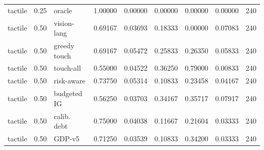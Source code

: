 \documentclass{article}
\begin{document}
\begin{center}
\begin{longtable}{lllllllll}
tactile & 0.25 & oracle & 1.00000 & 0.00000 & 0.00000 & 0.00000 & 0.00000 & 240 \\
tactile & 0.50 & vision-lang & 0.69167 & 0.03693 & 0.18333 & 0.00000 & 0.07083 & 240 \\
tactile & 0.50 & greedy touch & 0.69167 & 0.05472 & 0.25833 & 0.26350 & 0.05833 & 240 \\
tactile & 0.50 & touch-all & 0.55000 & 0.04522 & 0.36250 & 0.79000 & 0.00833 & 240 \\
tactile & 0.50 & risk-aware & 0.73750 & 0.05314 & 0.10833 & 0.23458 & 0.04167 & 240 \\
tactile & 0.50 & budgeted IG & 0.56250 & 0.03703 & 0.34167 & 0.35717 & 0.07917 & 240 \\
tactile & 0.50 & calib. debt & 0.75000 & 0.04038 & 0.11667 & 0.21604 & 0.03333 & 240 \\
tactile & 0.50 & GDP-v5 & 0.71250 & 0.03539 & 0.10833 & 0.34200 & 0.03333 & 240 \\
\bottomrule
\end{longtable}
\renewcommand{\arraystretch}{1.0}
\end{center}
\end{document}
